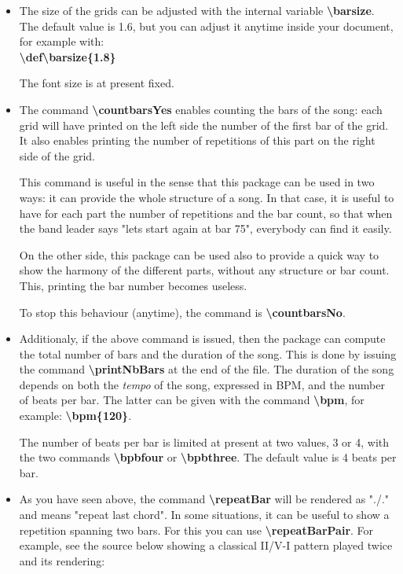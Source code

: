 \documentclass[11pt]{article}
\newcommand{\btt}{\bfseries \ttfamily }
\newcommand{\tbs}{\textbackslash{}}
\begin{document}
\begin{itemize}

\item The size of the grids can be adjusted with the internal variable 
{\btt \tbs barsize}.
The default value is 1.6, but you can adjust it anytime inside your document, for example with:\\
{\btt \tbs def\tbs barsize\{1.8\}}

The font size is at present fixed.

\item The command {\btt \tbs countbarsYes} enables counting the bars of the song:
each grid will have printed on the left side the number of the first bar of the grid.
It also enables printing the number of repetitions of this part on the right side of the grid.

This command is useful in the sense that this package can be used in two ways:
it can provide the whole structure of a song.
In that case, it is useful to have for each part the number of repetitions and the bar count, so that when the band leader says "lets start again at bar 75", everybody can find it easily.

On the other side, this package can be used also to provide a quick way to show the harmony of the different parts, without any structure or bar count.
This, printing the bar number becomes useless.

To stop this behaviour (anytime), the command is {\btt \tbs countbarsNo}.

\item Additionaly, if the above command is issued, then the package can compute the total number of bars and the duration of the song.
This is done by issuing the command {\btt \tbs printNbBars} at the end of the file.
The duration of the song depends on both the {\em tempo} of the song, expressed in BPM, and the number of beats per bar.
The latter can be given with the command {\btt \tbs bpm}, for example:
{\btt \tbs bpm\{120\}}.

The number of beats per bar is limited at present at two values, 3 or 4, with the two commands
{\btt \tbs bpbfour} or {\btt \tbs bpbthree}.
The default value is 4 beats per bar.

\item As you have seen above, the command {\btt \tbs repeatBar} will be rendered as "./."
and means "repeat last chord".
In some situations, it can be useful to show a repetition spanning two bars.
For this you can use {\btt \tbs repeatBarPair}.
For example, see the source below showing a classical II/V-I pattern played twice and its rendering:


\end{itemize}
\end{document}
